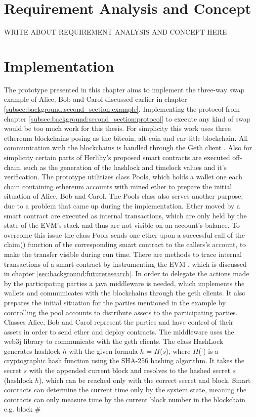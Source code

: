 \chapter{Requirement Analysis and Concept}
\label{ch:chapter03}
WRITE ABOUT REQUIREMENT ANALYSIS AND CONCEPT HERE

\chapter{Implementation}
\label{ch:chapter04}
The prototype presented in this chapter aims to implement the three-way swap example of Alice, Bob and Carol discussed earlier in chapter \ref{subsec:background:second_section:example}. Implementing the protocol from chapter \ref{subsec:background:second_section:protocol} to execute any kind of swap would be too much work for this thesis. For simplicity this work uses three ethereum blockchains posing as the bitcoin, alt-coin and car-title blockchain. All communication with the blockchains is handled through the Geth client \cite{gethclient}. Also for simplicity certain parts of Herlihy's proposed smart contracts are executed off-chain, such as the generation of the hashlock and timelock values and it's verification. The prototype utilitizes class Pools, which holds a wallet one each chain containing ethereum accounts with mined ether to prepare the initial situation of Alice, Bob and Carol. The Pools class also serves another purpose, due to a problem that came up during the implementation. Ether moved by a smart contract are executed as internal transactions, which are only held by the state of the \ac{EVM}'s stack and thus are not visible on an account's balance. To overcome this issue the class Pools sends one ether upon a successful call of the claim() function of the corresponding smart contract to the callers's account, to make the transfer visible during run time. There are methods to trace internal transactions of a smart contract by instrumenting the \ac{EVM} \cite{instrumentingEVM}, which is discussed in chapter \ref{sec:background:futureresearch}. In order to delegate the actions made by the participating parties a java middleware is needed, which implements the wallets and communicates with the blockchains through the geth clients. It also prepares the initial situation for the parties mentioned in the example by controlling the pool accounts to distribute assets to the participating parties. Classes Alice, Bob and Carol represent the parties and have control of their assets in order to send ether and deploy contracts. The middleware uses the web3j library \cite{web3j} to communicate with the geth clients. The class HashLock generates hashlock $h$ with the given formula $h$ = $H$($s$), where $H$($\cdot$) is a cryptographic hash function using the \ac{SHA-256} hashing algorithm. It takes the secret $s$ with the appended current block and resolves to the hashed secret $s$ (hashlock $h$), which can be reached only with the correct secret and block. Smart contracts can determine the current time only by the system state, meaning the contracts can only measure time by the current block number in the blockchain e.g. block \# 